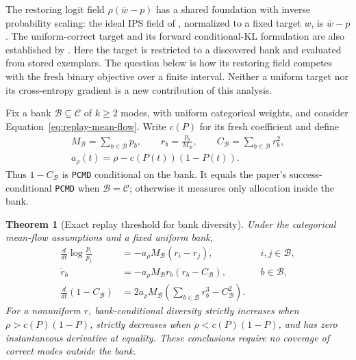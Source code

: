 \documentclass{article}
\newcommand{\enforcehalffinalproseline}{%
  \setlength{\parfillskip}{0pt plus .20\linewidth}}
\newcommand{\1}{\mathbf 1}
\newcommand{\pmd}{\texttt{PCMD}}
\newtheorem{theorem}[lemma]{Theorem}
\theoremstyle{remark}
\theoremstyle{definition}
\theoremstyle{plain}
\begin{document}
The restoring logit field $\rho(\bar w-p)$ has a shared foundation with
inverse probability scaling: the ideal IPS field of
\citet[Theorem~4.1]{sinha2026expected}, normalized to a fixed target $w$, is
$\bar w-p$. The uniform-correct target and its forward conditional-KL
formulation are also established by \citet{lochab2026ucpo}. Here the target is
restricted to a discovered bank and evaluated from stored exemplars. The
question below is how its restoring field competes with the fresh binary
objective over a finite interval. Neither a uniform target nor its
cross-entropy gradient is a new contribution of this analysis.

Fix a bank $\mathcal B\subseteq\mathcal C$ of $k\ge2$ modes, with uniform
categorical weights, and consider Equation~\eqref{eq:replay-mean-flow}.
Write $c(P)$ for its fresh coefficient and define
\begin{equation}
 \begin{gathered}
 M_{\mathcal B}=\sum_{b\in\mathcal B}p_b,\qquad
 r_b=\frac{p_b}{M_{\mathcal B}},\qquad
 C_{\mathcal B}=\sum_{b\in\mathcal B}r_b^2,\\
 a_\rho(t)=\rho-c(P(t))(1-P(t)).
 \end{gathered}
 \label{eq:replay-finite-notation}
\end{equation}
Thus $1-C_{\mathcal B}$ is \pmd{} conditional on the bank. It equals the
paper's success-conditional \pmd{} when $\mathcal B=\mathcal C$; otherwise
it measures only allocation inside the bank.

\begin{theorem}[Exact replay threshold for bank diversity]
\enforcehalffinalproseline
\label{thm:replay-finite-threshold}
Under the categorical mean-flow assumptions and a fixed uniform bank,
\begin{align}
 \frac{d}{dt}\log\frac{p_i}{p_j}
  &=-a_\rho M_{\mathcal B}(r_i-r_j),
   &&i,j\in\mathcal B,\label{eq:replay-finite-ratio}\\
 \dot r_b&=-a_\rho M_{\mathcal B}r_b(r_b-C_{\mathcal B}),
   &&b\in\mathcal B,\label{eq:replay-finite-conditional}\\
 \frac{d}{dt}(1-C_{\mathcal B})
  &=2a_\rho M_{\mathcal B}
    \left(\sum_{b\in\mathcal B}r_b^3-C_{\mathcal B}^2\right).
 \label{eq:replay-finite-pcmd}
\end{align}
For a nonuniform $r$, bank-conditional diversity strictly increases when
$\rho>c(P)(1-P)$, strictly decreases when $\rho<c(P)(1-P)$, and has zero
instantaneous derivative at equality. These conclusions require no coverage
of correct modes outside the bank.
\end{theorem}
\end{document}
